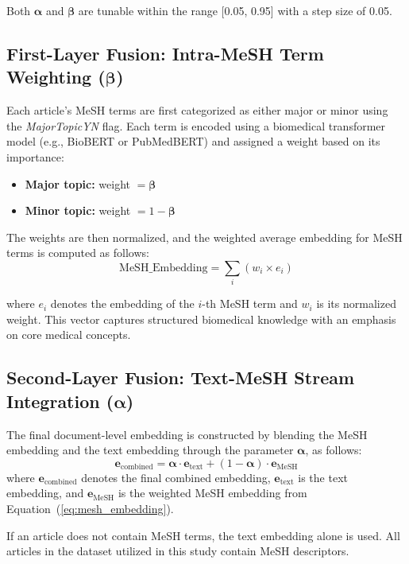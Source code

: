 \documentclass[utf8]{FrontiersinHarvard}
\begin{document}
Both $\boldsymbol{\alpha}$ and $\boldsymbol{\beta}$ are tunable within the range [0.05, 0.95] with a step size of 0.05.

\subsection{First-Layer Fusion: Intra-MeSH Term Weighting ($\boldsymbol{\beta}$)}

Each article's MeSH terms are first categorized as either major or minor using the \textit{MajorTopicYN} flag.
Each term is encoded using a biomedical transformer model (e.g., BioBERT or PubMedBERT) and assigned a weight based on its importance:

\begin{itemize}
    \item \textbf{Major topic:} weight $= \boldsymbol{\beta}$
    \item \textbf{Minor topic:} weight $= 1 - \boldsymbol{\beta}$
\end{itemize}

The weights are then normalized, and the weighted average embedding for MeSH terms is computed as follows:
\begin{equation}
\text{MeSH\_Embedding} = \sum_i (w_i \times e_i)
\label{eq:mesh_embedding}
\end{equation}

where $e_i$ denotes the embedding of the $i$-th MeSH term and $w_i$ is its normalized weight.
This vector captures structured biomedical knowledge with an emphasis on core medical concepts.

\subsection{Second-Layer Fusion: Text-MeSH Stream Integration ($\boldsymbol{\alpha}$)}
The final document-level embedding is constructed by blending the MeSH embedding and the text embedding through the parameter $\boldsymbol{\alpha}$, as follows:
\begin{equation}
\bm{e}_{\text{combined}} = \boldsymbol{\alpha} \cdot \bm{e}_{\text{text}} + (1 - \boldsymbol{\alpha}) \cdot \bm{e}_{\text{MeSH}}
\label{eq:combined_embedding}
\end{equation}
where $\bm{e}_{\text{combined}}$ denotes the final combined embedding, $\bm{e}_{\text{text}}$ is the text embedding, and $\bm{e}_{\text{MeSH}}$ is the weighted MeSH embedding from Equation~(\ref{eq:mesh_embedding}).

If an article does not contain MeSH terms, the text embedding alone is used.
All articles in the dataset utilized in this study contain MeSH descriptors.
\end{document}
